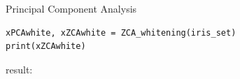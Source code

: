 \documentclass[
	ngerman,
	]{tudaexercise}
\begin{document}
\begin{task}{Principal Component Analysis}
\begin{subtask}
\begin{lstlisting}
xPCAwhite, xZCAwhite = ZCA_whitening(iris_set)
print(xZCAwhite)
\end{lstlisting}
result:\\

\begin{figure}[H] 
\centering
{}
\quad
{}


\end{figure}
\end{subtask}
\end{task}
\end{document}
